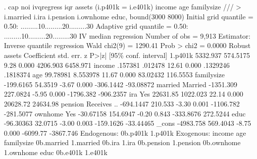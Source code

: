 . cap noi ivqregress iqr assets (i.p401k = i.e401k) income age familysize  ///
>         i.married i.ira i.pension i.ownhome educ, bound(3000 8000)
{\smallskip}
Initial grid
    quantile = 0.50: .........10.........20.........30
{\smallskip}
Adaptive grid
    quantile = 0.50: .........10.........20.........30
{\smallskip}
IV median regression                                   Number of obs =   9,913
Estimator: Inverse quantile regression                 Wald chi2(9)  = 1290.41
                                                       Prob > chi2   =  0.0000
{\smallskip}
             {\VBAR}               Robust
      assets {\VBAR} Coefficient  std. err.      z    P>|z|     [95\% conf. interval]
     1.p401k {\VBAR}   5332.937   574.5175     9.28   0.000     4206.903    6458.971
      income {\VBAR}    .157381    .012478    12.61   0.000     .1329246    .1818374
         age {\VBAR}   99.78981   8.553978    11.67   0.000     83.02432    116.5553
  familysize {\VBAR}  -199.6165    54.3519    -3.67   0.000    -306.1442   -93.08872
             {\VBAR}
     married {\VBAR}
    Married  {\VBAR}  -1351.309   227.0824    -5.95   0.000    -1796.382   -906.2357
             {\VBAR}
         ira {\VBAR}
        Yes  {\VBAR}   22631.85   1022.023    22.14   0.000     20628.72    24634.98
             {\VBAR}
     pension {\VBAR}
Receives ..  {\VBAR}  -694.1447    210.533    -3.30   0.001    -1106.782   -281.5077
             {\VBAR}
     ownhome {\VBAR}
        Yes  {\VBAR}  -30.67158   154.6947    -0.20   0.843    -333.8676    272.5244
        educ {\VBAR}  -96.30363    32.0715    -3.00   0.003    -159.1626   -33.44465
       _cons {\VBAR}  -4983.758   569.4043    -8.75   0.000     -6099.77   -3867.746
Endogenous: 0b.p401k 1.p401k
 Exogenous: income age familysize 0b.married 1.married 0b.ira 1.ira
            0b.pension 1.pension 0b.ownhome 1.ownhome educ 0b.e401k 1.e401k
{\smallskip}
